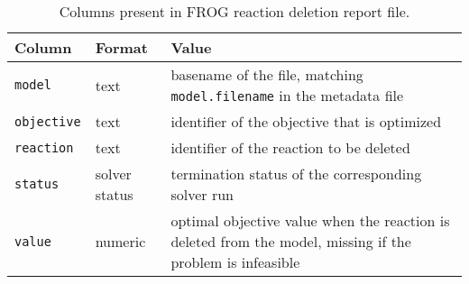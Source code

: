 \begin{table}\tablefont
\begin{tabular}{llp{30em}}
\toprule
Column & Format & Value \\
\midrule
\verb|model|
 & text
 & basename of the file, matching \verb|model.filename| in the metadata file
 \\
\verb|objective|
 & text
 & identifier of the objective that is optimized
 \\
\verb|reaction|
 & text
 & identifier of the reaction to be deleted
 \\
\verb|status|
 & solver status
 & termination status of the corresponding solver run
 \\
\verb|value|
 & numeric
 & optimal objective value when the reaction is deleted from the model, missing if the problem is infeasible
 \\
\bottomrule
\end{tabular}
\caption{Columns present in FROG reaction deletion report file.}
\label{tab:rxnsfields}
\end{table}
